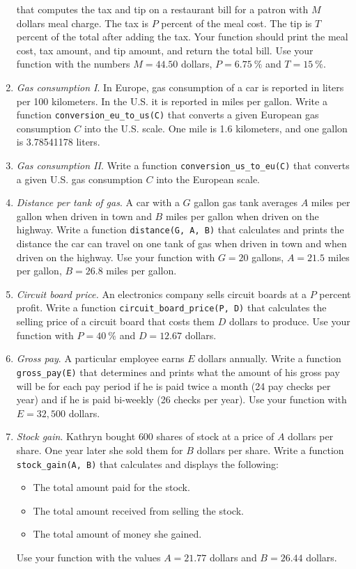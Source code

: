 \begin{enumerate}
that computes the tax and tip on a restaurant bill for a patron with 
$M$ dollars meal charge. The tax is $P$ percent of the meal cost. The tip is $T$ percent of the total after 
adding the tax. Your function should print the meal cost, 
tax amount, and tip amount, and return the total bill. Use your function with 
the numbers $M = 44.50$ dollars, $P = 6.75 \ \%$ and $T = 15 \ \%$. 
\item {\em Gas consumption I}. In Europe, gas consumption of a car is reported in liters per 100 kilometers. In the U.S. 
it is reported in miles per gallon. Write a function {\tt conversion\_eu\_to\_us(C)} that converts a given European 
gas consumption $C$ into the U.S. scale. One mile is 1.6 kilometers, and one gallon is 3.78541178 liters. 
\item {\em Gas consumption II}. Write a function {\tt conversion\_us\_to\_eu(C)} that converts a given U.S.
gas consumption $C$ into the European scale.
\item {\em Distance per tank of gas}. A car with a $G$ gallon gas tank averages $A$ miles per gallon 
when driven in town and 
$B$ miles per gallon when driven on the highway. Write a function {\tt distance(G, A, B)} 
that calculates and prints 
the distance the car can travel on one tank of gas when driven in town and when driven on the highway. 
Use your function with $G = 20$ gallons, $A = 21.5$ miles per gallon, $B = 26.8$ miles per gallon. 
\item {\em Circuit board price.} An electronics company sells circuit boards at a $P$ percent profit. 
Write a function {\tt circuit\_board\_price(P, D)} 
that calculates the selling price of a circuit board that costs them $D$ dollars to
produce. Use your function with $P = 40\ \%$ and $D = 12.67$ dollars.
\item {\em Gross pay}. A particular employee earns $E$ dollars annually. Write a function 
{\tt gross\_pay(E)} that determines and prints what the amount of his gross pay will be for each pay period 
if he is paid twice a month (24 pay checks per year) and if he is paid bi-weekly (26 checks per 
year). Use your function with $E = 32,500$ dollars.
\item {\em Stock gain}. Kathryn bought $600$ shares of stock at a price of $A$ dollars per share. 
One year later she 
sold them for $B$ dollars per share. Write a function {\tt stock\_gain(A, B)} that calculates and 
displays the following:
\begin{itemize}
\item The total amount paid for the stock.
\item The total amount received from selling the stock.
\item The total amount of money she gained.
\end{itemize}
Use your function with the values $A = 21.77$ dollars and $B = 26.44$ dollars.
\end{enumerate}

